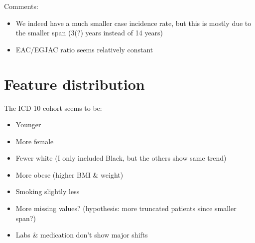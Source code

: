 \documentclass[english]{article}
\begin{document}
Comments:
\begin{itemize}
	\item We indeed have a much smaller case incidence rate, but this is mostly
	due to the smaller span (3(?) years instead of 14 years)
	\item EAC/EGJAC ratio seems relatively constant
\end{itemize}

\newpage
\clearpage
\section{Feature distribution}

The ICD 10 cohort seems to be:
\begin{itemize}
	\item Younger
	\item More female
	\item Fewer white (I only included Black, but the others show same trend)
	\item More obese (higher BMI \& weight)
	\item Smoking slightly less
	\item More missing values? (hypothesis: more truncated patients since smaller span?)
	\item Labs \& medication don't show major shifts
\end{itemize}
\end{document}
